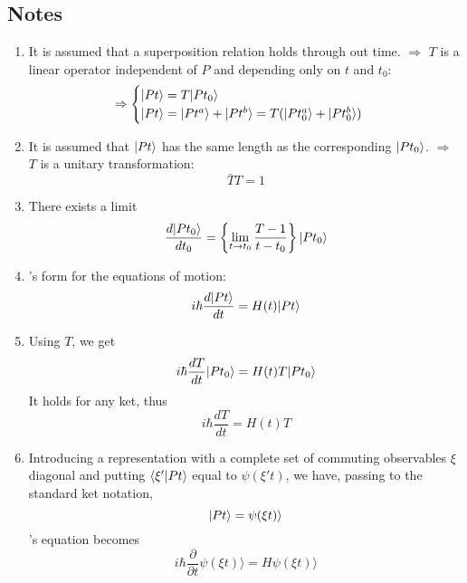 \subsection{Notes}
\begin{enumerate}

	\item It is assumed that a superposition relation holds through out time. $\Rightarrow$ $T$ is a linear operator independent of $P$ and depending only on $t$ and $t_0$:
	\begin{equation}
	\Rightarrow
	\begin{cases}
	 | Pt \rangle=T| Pt_0 \rangle\\
	 | Pt \rangle=| Pt^a \rangle+| Pt^b \rangle=T(| Pt_0^a \rangle+| Pt_0^b \rangle)
	 \end{cases}
	\end{equation}

	\item It is assumed that $| Pt \rangle$ has the same length as the corresponding $| Pt_0 \rangle$. $\Rightarrow$ $T$ is a unitary transformation:
	\begin{equation}
	\bar{T}T=1
	\end{equation}

	\item There exists a limit
	\begin{equation}
	\frac{d| Pt_0 \rangle}{dt_0} =\left\{\lim_{t \rightarrow t_0} \frac{T-1}{t-t_0}\right\}| Pt_0 \rangle
	\end{equation}

	\item \sch's form for the equations of motion:
	\begin{equation}
	i\hbar \frac{d| Pt \rangle}{dt}=H(t)| Pt \rangle
	\end{equation}

	\item Using $T$, we get
	\begin{equation}
	i\hbar \frac{dT}{dt}| Pt_0 \rangle=H(t)T| Pt_0 \rangle
	\end{equation}
	It holds for any ket, thus
	\begin{equation}
	i\hbar \frac{dT}{dt}=H(t)T
	\end{equation}

	\item Introducing a representation with a complete set of commuting observables $\xi$ diagonal and putting $\langle \xi' | Pt \rangle$ equal to $\psi(\xi't)$, we have, passing to the standard ket notation,
	\begin{equation*}
	| Pt \rangle=\psi(\xi t)\rangle
	\end{equation*}
	\sch's equation becomes
	\begin{equation}
	i\hbar \frac{\partial}{\partial t} \psi(\xi t)\rangle = H\psi(\xi t) \rangle
	\end{equation}
	

\end{enumerate}
